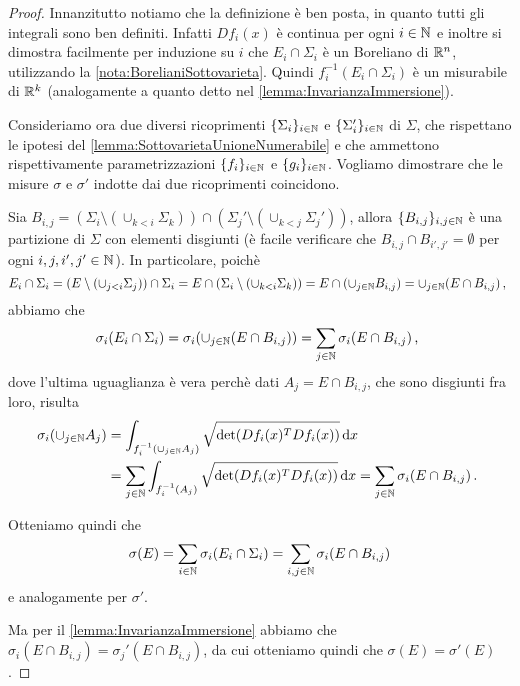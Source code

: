 \begin{proof}
	Innanzitutto notiamo che la definizione è ben posta, in quanto tutti gli integrali sono ben definiti. Infatti $Df_i(x)$ è continua per ogni $i\in\mathbb N$ e inoltre si dimostra facilmente per induzione su $i$ che $E_i\cap\Sigma_i$ è un Boreliano di $\mathbb R^n$, utilizzando la \cref{nota:BorelianiSottovarieta}. Quindi $f_i^{-1}(E_i\cap\Sigma_i)$ è un misurabile di $\mathbb R^k$ (analogamente a quanto detto nel \cref{lemma:InvarianzaImmersione}).

	Consideriamo ora due diversi ricoprimenti $\{\Sigma_i\}_{i\in\mathbb N}$ e $\{\Sigma_i'\}_{i\in\mathbb N}$ di $\Sigma$, che rispettano le ipotesi del \cref{lemma:SottovarietaUnioneNumerabile} e che ammettono rispettivamente parametrizzazioni $\{f_i\}_{i\in\mathbb N}$ e $\{g_i\}_{i\in\mathbb N}$. Vogliamo dimostrare che le misure $\sigma$ e $\sigma'$ indotte dai due ricoprimenti coincidono.
	
	Sia $B_{i,j}=(\Sigma_i\setminus (\cup_{k<i}\Sigma_k))\cap (\Sigma_j'\setminus (\cup_{k<j}\Sigma_j'))$, allora $\{B_{i,j}\}_{i,j\in\mathbb N}$ è una partizione di $\Sigma$ con elementi disgiunti (è facile verificare che $B_{i,j}\cap B_{i',j'}=\emptyset$ per ogni $i,j,i',j'\in\mathbb N$). In particolare, poichè
	\begin{equation*}
		E_i\cap\Sigma_i=(E\setminus (\cup_{j<i}\Sigma_j))\cap \Sigma_i=E\cap (\Sigma_i\setminus (\cup_{k<i}\Sigma_k))=E\cap (\cup_{j\in\mathbb N}B_{i,j})=\cup_{j\in\mathbb N}(E\cap B_{i,j})\, \text{, }
	\end{equation*}
	abbiamo che
	\begin{equation*}
		\sigma_i(E_i\cap \Sigma_i)=\sigma_i(\cup_{j\in\mathbb N}(E\cap B_{i,j}))=\sum_{j\in\mathbb N}\sigma_i(E\cap B_{i,j})\, \text{, }
	\end{equation*}
	dove l'ultima uguaglianza è vera perchè dati $A_j=E\cap B_{i,j}$, che sono disgiunti fra loro, risulta
	\begin{align*}
		\sigma_i(\cup_{j\in\mathbb N}A_j)& =\int_{f_i^{-1}(\cup_{j\in\mathbb N}A_j)}\sqrt{\det(Df_i(x)^TDf_i(x))} \,\mathrm d x\\
		&=\sum_{j\in\mathbb N}\int_{f_i^{-1}(A_j)}\sqrt{\det(Df_i(x)^TDf_i(x))} \,\mathrm d x=\sum_{j\in\mathbb N}\sigma_i(E\cap B_{i,j})\, \text{. }
	\end{align*}
	
	Otteniamo quindi che
	\begin{equation*}
		\sigma(E)=\sum_{i\in\mathbb N}\sigma_i(E_i\cap \Sigma_i)=\sum_{i,j\in\mathbb N} \sigma_i(E\cap B_{i,j})
	\end{equation*}
	e analogamente per $\sigma'$.

	Ma per il \cref{lemma:InvarianzaImmersione} abbiamo che $\sigma_i(E\cap B_{i,j})=\sigma_j'(E\cap B_{i,j})$, da cui otteniamo quindi che $\sigma(E)=\sigma'(E)$.
\end{proof}

